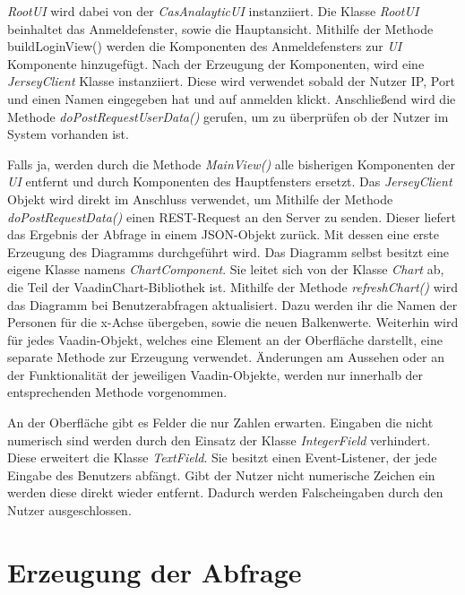 \textit{RootUI} wird dabei von der \textit{CasAnalayticUI} instanziiert. Die Klasse \textit{RootUI} beinhaltet das Anmeldefenster, sowie die Hauptansicht. Mithilfe der Methode buildLoginView() werden die Komponenten des Anmeldefensters zur \textit{UI} Komponente hinzugefügt. Nach der Erzeugung der Komponenten, wird eine \textit{JerseyClient} Klasse instanziiert. Diese wird verwendet sobald der Nutzer IP, Port und einen Namen eingegeben hat und auf anmelden klickt. Anschließend wird die Methode \textit{doPostRequestUserData()} gerufen, um zu überprüfen ob der Nutzer im System vorhanden ist. 

Falls ja, werden durch die Methode \textit{MainView()} alle bisherigen Komponenten der \textit{UI} entfernt und durch Komponenten des Hauptfensters ersetzt. Das \textit{JerseyClient} Objekt wird direkt im Anschluss verwendet, um Mithilfe der Methode \textit{doPostRequestData()} einen REST-Request an den Server zu senden. Dieser liefert das Ergebnis der Abfrage in einem JSON-Objekt zurück. Mit dessen eine erste Erzeugung des Diagramms durchgeführt wird. Das Diagramm selbst besitzt eine eigene Klasse namens \textit{ChartComponent}. Sie leitet sich von der Klasse \textit{Chart} ab, die Teil der VaadinChart-Bibliothek ist. Mithilfe der Methode \textit{refreshChart()} wird das Diagramm bei Benutzerabfragen aktualisiert. Dazu werden ihr die Namen der Personen für die x-Achse übergeben, sowie die neuen Balkenwerte. Weiterhin wird für jedes Vaadin-Objekt, welches eine Element an der Oberfläche darstellt, eine separate Methode zur Erzeugung verwendet. Änderungen am Aussehen oder an der Funktionalität der jeweiligen Vaadin-Objekte, werden nur innerhalb der entsprechenden Methode vorgenommen.

An der Oberfläche gibt es Felder die nur Zahlen erwarten. Eingaben die nicht numerisch sind werden durch den Einsatz der Klasse \textit{IntegerField} verhindert. Diese erweitert die Klasse \textit{TextField}. Sie besitzt einen Event-Listener, der jede Eingabe des Benutzers abfängt. Gibt der Nutzer nicht numerische Zeichen ein werden diese direkt wieder entfernt. Dadurch werden Falscheingaben durch den Nutzer ausgeschlossen.

\section{Erzeugung der Abfrage}

